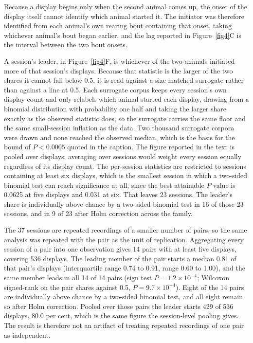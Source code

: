 \documentclass[pdflatex, sn-nature]{sn-jnl}
\theoremstyle{thmstyleone}%
\theoremstyle{thmstyletwo}%
\theoremstyle{thmstylethree}%
\begin{document}
Because a display begins only when the second animal comes up, the onset of the display itself cannot identify which animal started it. The initiator was therefore identified from each animal's own rearing bout containing that onset, taking whichever animal's bout began earlier, and the lag reported in Figure~\ref{fig4}C is the interval between the two bout onsets.

A session's leader, in Figure~\ref{fig4}F, is whichever of the two animals initiated more of that session's displays. Because that statistic is the larger of the two shares it cannot fall below 0.5, it is read against a size-matched surrogate rather than against a line at 0.5. Each surrogate corpus keeps every session's own display count and only relabels which animal started each display, drawing from a binomial distribution with probability one half and taking the larger share exactly as the observed statistic does, so the surrogate carries the same floor and the same small-session inflation as the data. Two thousand surrogate corpora were drawn and none reached the observed median, which is the basis for the bound of $P < 0.0005$ quoted in the caption. The figure reported in the text is pooled over displays; averaging over sessions would weight every session equally regardless of its display count. The per-session statistics are restricted to sessions containing at least six displays, which is the smallest session in which a two-sided binomial test can reach significance at all, since the best attainable $P$ value is 0.0625 at five displays and 0.031 at six. That leaves 23 sessions. The leader's share is individually above chance by a two-sided binomial test in 16 of those 23 sessions, and in 9 of 23 after Holm correction across the family.

The 37 sessions are repeated recordings of a smaller number of pairs, so the same analysis was repeated with the pair as the unit of replication. Aggregating every session of a pair into one observation gives 14 pairs with at least five displays, covering 536 displays. The leading member of the pair starts a median 0.81 of that pair's displays (interquartile range 0.74 to 0.91, range 0.60 to 1.00), and the same member leads in all 14 of 14 pairs (sign test $P = 1.2 \times 10^{-4}$; Wilcoxon signed-rank on the pair shares against 0.5, $P = 9.7 \times 10^{-4}$). Eight of the 14 pairs are individually above chance by a two-sided binomial test, and all eight remain so after Holm correction. Pooled over those pairs the leader starts 429 of 536 displays, 80.0 per cent, which is the same figure the session-level pooling gives. The result is therefore not an artifact of treating repeated recordings of one pair as independent.
\end{document}
